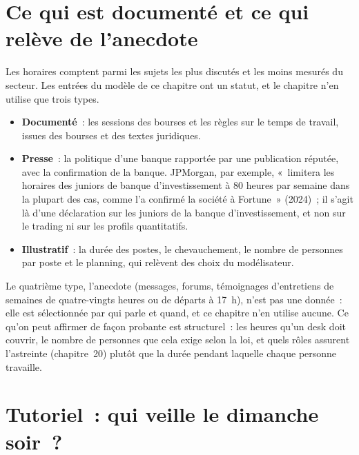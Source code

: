\section{Ce qui est documenté et ce qui relève de l'anecdote}

Les horaires comptent parmi les sujets les plus discutés et les moins mesurés du secteur. Les entrées du modèle de ce chapitre ont
un statut, et le chapitre n'en utilise que trois types.
\begin{itemize}
\item \textbf{Documenté}~: les sessions des bourses et les règles sur le temps de travail, issues des bourses et des textes juridiques.
\item \textbf{Presse}~: la politique d'une banque rapportée par une publication réputée, avec la confirmation de la banque. JPMorgan, par
exemple, «~limitera les horaires des juniors de banque d'investissement à 80 heures par semaine dans la plupart des cas, comme l'a confirmé la société à Fortune~» (2024)~;
il s'agit là d'une déclaration sur les juniors de la banque d'investissement, et non sur le trading ni sur les profils quantitatifs.
\item \textbf{Illustratif}~: la durée des postes, le chevauchement, le nombre de personnes par poste et le planning, qui relèvent des choix du modélisateur.
\end{itemize}
Le quatrième type, l'anecdote (messages, forums, témoignages d'entretiens de semaines de quatre-vingts heures ou de départs à 17~h), n'est pas une donnée~:
elle est sélectionnée par qui parle et quand, et ce chapitre n'en utilise aucune. Ce qu'on peut affirmer de façon probante est structurel~:
les heures qu'un desk doit couvrir, le nombre de personnes que cela exige selon la loi, et quels rôles assurent l'astreinte (chapitre~20)
plutôt que la durée pendant laquelle chaque personne travaille.

\section{Tutoriel~: qui veille le dimanche soir~?}\label{tut:in:hours-rhythm-and-intensity:tut}


